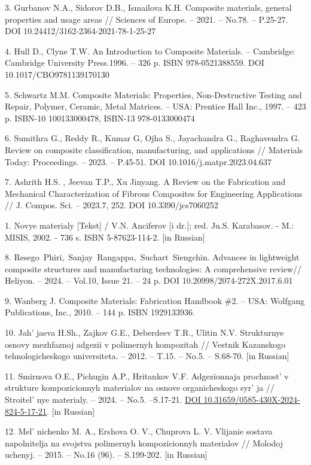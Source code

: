 3. Gurbanov N.A., Sidorov D.B., Ismailova K.H. Composite materials,
general properties and usage areas // Sciences of Europe. -- 2021. --
No.78. -- P.25-27. DOI 10.24412/3162-2364-2021-78-1-25-27

4. Hull D., Clyne T.W. An Introduction to Composite Materials. --
Cambridge: Cambridge University Press.1996. -- 326 p. ISBN
978-0521388559. DOI 10.1017/CBO9781139170130

5. Schwartz M.M. Composite Materials: Properties, Non-Destructive Testing
and Repair, Polymer, Ceramic, Metal Matrices. -- USA: Prentice Hall
Inc., 1997. -- 423 p. ISBN-10 100133000478, ISBN-13 978-0133000474

6. Sumithra G., Reddy R., Kumar G, Ojha S., Jayachandra G., Raghavendra
G. Review on composite classification, manufacturing, and applications
// Materials Today: Proceedings. -- 2023. -- P.45-51. DOI
10.1016/j.matpr.2023.04.637

7. Ashrith H.S. , Jeevan T.P., Xu Jinyang. A Review on the Fabrication
and Mechanical Characterization of Fibrous Composites for Engineering
Applications // J. Compos. Sci. -- 2023.7, 252. DOI
10.3390/jcs7060252

1. Novye materialy {[}Tekst{]} / V.N. Anciferov {[}i dr.{]}; red. Ju.S.
Karabasov. - M.: MISIS, 2002. - 736 s. ISBN 5-87623-114-2. {[}in
Russian{]}

8. Resego~Phiri,~Sanjay~Rangappa,~Suchart~Siengchin. Advances in
lightweight composite structures and manufacturing technologies: A
comprehensive review// Heliyon. -- 2024. -- Vol.10, Issue 21. -- 24
p. DOI 10.20998/2074-272X.2017.6.01

9. Wanberg J. Composite Materials: Fabrication Handbook \#2. -- USA:
Wolfgang Publications, Inc., 2010. -- 144 p. ISBN 1929133936.

10. Jah' jaeva H.Sh., Zajkov G.E., Deberdeev T.R., Ulitin
N.V. Strukturnye osnovy mezhfaznoj adgezii v polimernyh kompozitah //
Vestnik Kazanskogo tehnologicheskogo universiteta. -- 2012. -- T.15.
-- No.5. -- S.68-70. {[}in Russian{]}

11. Smirnova O.E., Pichugin A.P., Hritankov V.F. Adgezionnaja
prochnost'{} v strukture kompozicionnyh materialov na
osnove organicheskogo syr' ja //
Stroitel' nye materialy. -- 2024. -- No.5. --S.17-21.
\href{https://doi.org/10.31659/0585-430X-2024-824-5-17-21}{DOI
10.31659/0585-430X-2024-824-5-17-21}. {[}in Russian{]}

12. Mel' nichenko M. A., Ershova O. V., Chuprova L. V.
Vlijanie sostava napolnitelja na svojstva polimernyh kompozicionnyh
materialov // Molodoj uchenyj. -- 2015. -- No.16 (96). -- S.199-202.
{[}in Russian{]}

